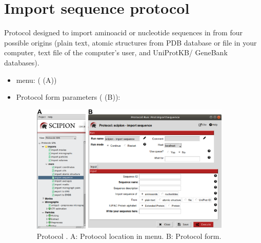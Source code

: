 \section{Import sequence protocol}
\label{app:importSequence}%
Protocol designed to import aminoacid or nucleotide sequences in \scipion from four possible origins (plain text, atomic structures from PDB database or file in your computer, text file of the computer's user, and UniProtKB/ GeneBank databases).

\begin{itemize}
  \item \scipion menu:
   ( (A))
  
  \item Protocol form parameters ( (B)):
  
  \begin{figure}[H]
    \centering 
    \captionsetup{width=.7\linewidth} 
    \includegraphics[width=0.90\textwidth]{Images_appendix/Fig104.pdf}
    \caption{Protocol . A: Protocol location in \scipion menu. B: Protocol form.}
    \label{fig:app_protocol_sequence_1}
   \end{figure}
  

\end{itemize}
